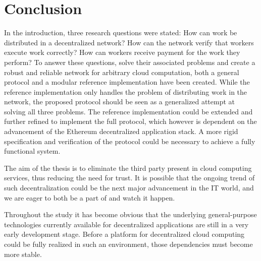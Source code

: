 \chapter{Conclusion}
In the introduction, three research questions were stated: How can work be distributed in a decentralized network? How can the network verify that workers execute work correctly? How can workers receive payment for the work they perform? To answer these questions, solve their associated problems and create a robust and reliable network for arbitrary cloud computation, both a general protocol and a modular reference implementation have been created. While the reference implementation only handles the problem of distributing work in the network, the proposed protocol should be seen as a generalized attempt at solving all three problems. The reference implementation could be extended and further refined to implement the full protocol, which however is dependent on the advancement of the Ethereum decentralized application stack. A more rigid specification and verification of the protocol could be necessary to achieve a fully functional system.

The aim of the thesis is to eliminate the third party present in cloud computing services, thus reducing the need for trust. It is possible that the ongoing trend of such decentralization could be the next major advancement in the IT world, and we are eager to both be a part of and watch it happen.

Throughout the study it has become obvious that the underlying general-purpose technologies currently available for decentralized applications are still in a very early development stage. Before a platform for decentralized cloud computing could be fully realized in such an environment, those dependencies must become more stable.

